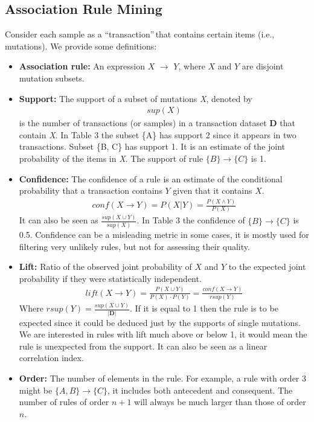 \documentclass[twoside,twocolumn]{article}
\begin{document}
	\subsection{Association Rule Mining}
	Consider each sample as a \textquotedblleft transaction\textquotedblright$\,$that contains certain items (i.e., mutations). We provide some definitions:
	\begin{itemize}
		\item \textbf{Association rule:} An expression $X$ $\rightarrow$ $Y$, where $X$ and $Y$ are disjoint mutation subsets. 
		\item \textbf{Support:} The support of a subset of mutations \textit{X}, denoted by 
		\begin{align*}
			sup(X)
		\end{align*} is the number of transactions (or samples) in a transaction dataset \textbf{D} that contain \textit{X}. In Table 3 the subset \{A\} has support 2 since it appears in two transactions. Subset \{B, C\} has support 1. It is an estimate of the joint probability of the items in \textit{X}. The support of rule $\{B\} \rightarrow \{C\}$ is 1.
		\item \textbf{Confidence:} The confidence of a rule is an estimate of the conditional probability that a transaction contains $Y$ given that it contains $X$.
		\begin{align*}
			conf(X \rightarrow Y) = P(X|Y) = \frac{P(X \land Y)}{P(X)}
		\end{align*}
		It can also be seen as $\frac{sup(X \cup Y)}{sup(X)}$. In Table 3 the confidence of $\{B\} \rightarrow \{C\}$ is 0.5. Confidence can be a misleading metric in some cases, it is mostly used for filtering very unlikely rules, but not for assessing their quality.
		\item \textbf{Lift:} Ratio of the observed joint probability of $X$ and $Y$ to the expected joint probability if they were statistically independent.	
		\begin{align*}
			lift(X \rightarrow Y) = \frac{P(X\cup Y)}{P(X)\cdot P(Y)} = \frac{conf(X\rightarrow Y)}{rsup(Y)}
		\end{align*}
		Where $rsup(Y) = \frac{sup(X\cup Y)}{|\mathbf{D}|}$. If it is equal to 1 then the rule is to be expected since it could be deduced just by the supports of single mutations. We are interested in rules with lift much above or below 1, it would mean the rule is unexpected from the support. It can also be seen as a linear correlation index. 
		\item \textbf{Order: } The number of elements in the rule. For example, a rule with order 3 might be $\{A,B\} \rightarrow \{C\}$, it includes both antecedent and consequent. The number of rules of order $n + 1$ will always be much larger than those of order $n$.
	\end{itemize}
\end{document}
